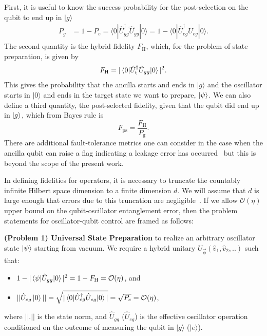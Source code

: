 \documentclass[aps,prx,showpacs,notitlepage,twocolumn,superscriptaddress,nofootinbib,preprintnumbers,floatfix,10pt, longbibliography]{revtex4-2}
\begin{document}
First, it is useful to know the success probability for the post-selection on the qubit to end up in $|g\rangle$
\begin{align}
  P_g &= 1-P_e = \langle 0|\hat U^\dagger_{gg}\hat U_{gg}|0\rangle = 1-\langle 0|\hat U^\dagger_{eg}\hat U_{eg}|0\rangle.\label{eq:prob}
\end{align}
The second quantity is the hybrid fidelity $F_\mathrm{H}$, which, for the problem of state preparation, is given by
\begin{align}
  F_\mathrm{H}=|\braket{0|\hat U_{\mathrm{t}}^\dagger \hat U_{gg}|0}|^2.\label{eq:fid}
\end{align}
This gives the probability that the ancilla starts and ends in $|g\rangle$ and the oscillator starts in $|0\rangle$ and ends in the target state we want to prepare, $\ket{\psi}$. 
We can also define a third quantity, the post-selected fidelity, given that the qubit did end up in $\ket{g}$, which from Bayes rule is
\begin{equation}
    F_\mathrm{ps}=\frac{F_\mathrm{H}}{P_\mathrm{g}}.
\end{equation}
There are additional fault-tolerance metrics one can consider in the case when the ancilla qubit can raise a flag indicating a leakage error has occurred~\cite{ReinholdErrorCorrectedGates,ma2020path,ma2022algebraic} but this is beyond the scope of the present work.

In defining fidelities for operators, it is necessary to truncate the countably infinite Hilbert space dimension to a finite dimension $d$. We will assume that $d$ is large enough that errors due to this truncation are negligible~\cite{ISA}. If we allow $\mathcal{O}(\eta)$ upper bound on the qubit-oscillator entanglement error, then the problem statements for oscillator-qubit control are framed as follows:

  \textbf{(Problem 1) Universal State Preparation} to realize an arbitrary oscillator state $\ket{\psi}$ starting from vacuum. We require a hybrid unitary $U_{\vec{\phi}}(\hat v_1,\hat v_2,..)$ such that:
  \begin{itemize}
      \item $1-|\braket{\psi|\hat U_{gg}|0}|^2=1-F_\mathrm{H}=\mathcal{O}(\eta)$, and
    \item $||\hat U_{eg}\ket{0}||=\sqrt{|\braket{0|\hat U_{eg}^\dagger \hat U_{eg}|0}|}=\sqrt{P_e}=\mathcal{O}(\eta)$,
  \end{itemize}
  where $||.||$ is the state norm, and $\hat U_{gg}$ ($\hat U_{eg}$) is the effective oscillator operation conditioned on the outcome of measuring the qubit in $|g\rangle$ ($|e\rangle$).
\end{document}
